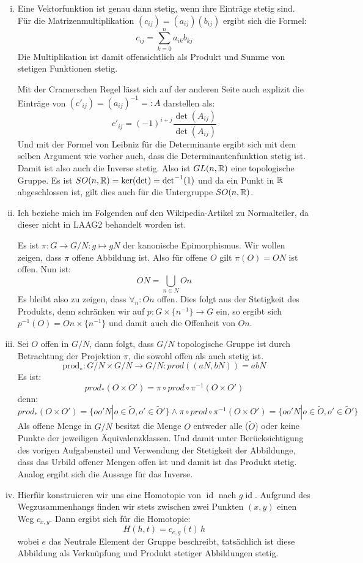 \documentclass{scrartcl}
\newcommand{\id}{\operatorname{id}}
\begin{document}
\newpage
\begin{aufgabe}
\begin{enumerate}[(i)]
\item Eine Vektorfunktion ist genau dann stetig, wenn ihre Einträge stetig sind. Für die Matrizenmultiplikation $ (c_{ij})=(a_{ij})(b_{ij}) $ ergibt sich die Formel:
\[
c_{ij}=\sum_{k=0}^n a_{ik} b_{kj}
\]
Die Multiplikation ist damit offensichtlich als Produkt und Summe von stetigen Funktionen stetig.
  
Mit der Cramerschen Regel lässt sich auf der anderen Seite auch explizit die Einträge von $(c'_{ij})=(a_{ij})^{-1}=:A$ darstellen als:
\[
c'_{ij}=(-1)^{i+j} \frac{\det(A_{ij})}{\det(A_{ij})}
\]
Und mit der Formel von Leibniz für die Determinante ergibt sich mit dem selben Argument wie vorher auch, dass die Determinantenfunktion stetig ist. Damit ist also auch die Inverse stetig. Also ist $ GL(n, \mathbb{R}) $ eine topologische Gruppe.  Es ist $ SO(n, \mathbb{R})=\ker(\det)=\det^{-1}(1) $ und da ein Punkt in $ \mathbb{R} $ abgeschlossen ist, gilt dies auch für die Untergruppe $ SO(n, \mathbb{R}) $. 

\item Ich beziehe mich im Folgenden auf den Wikipedia-Artikel zu Normalteiler, da dieser nicht in LAAG2 behandelt worden ist. 

Es ist $ \pi: G\to G/N: g\mapsto gN $ der kanonische Epimorphismus. Wir wollen zeigen, dass $ \pi $ offene Abbildung ist.  Also für offene $ O $ gilt $ \pi(O)=ON $ ist offen. Nun ist:
\[
ON=\bigcup_{n\in N} On
\]
Es bleibt also zu zeigen, dass $ \forall_n: On $ offen.  Dies folgt aus der Stetigkeit des Produkts, denn schränken wir auf $p: G\times\{n^{-1}\} \to G $ ein, so ergibt sich $ p^{-1}(O)=On\times \{n^{-1}\} $ und damit auch die Offenheit von $ On $.
\item Sei $ O $ offen in $ G/N $, dann folgt, dass $ G/N $ topologische Gruppe ist durch Betrachtung der Projektion $ \pi $, die sowohl offen als auch stetig ist.
\[
\text{prod}_*: G/N \times G/N \to G/N: prod((aN,bN))=abN
\]
Es ist:
\[
prod_*(O\times O')=\pi\circ prod \circ \pi^{-1} (O\times O')
\]
denn:
\[
prod_*(O \times O')=\{oo'N| o\in \tilde O, o' \in \tilde O'\} \land \pi\circ prod \circ \pi^{-1} (O\times O')=\{oo'N| o \in \tilde O, o' \in \tilde O'\}
\]
Als offene Menge in $ G/N $ besitzt die Menge $ O $ entweder alle ($ \tilde O $) oder keine Punkte der jeweiligen Äquivalenzklassen.
Und damit unter Berücksichtigung des vorigen Aufgabensteil und Verwendung der Stetigkeit der Abbildunge, dass das Urbild offener Mengen offen ist und damit ist das Produkt stetig. Analog ergibt sich die Aussage für das Inverse.
\item Hierfür konstruieren wir uns eine Homotopie von $ \id $ nach $ g\id $.  Aufgrund des Wegzusammenhangs finden wir stets zwischen zwei Punkten $(x,y)$ einen Weg $c_{x,y}$. Dann ergibt sich für die Homotopie:
\[
H(h,t)=c_{e, g}(t) \, h
\]
wobei $ e $ das Neutrale Element der Gruppe beschreibt, tatsächlich ist diese Abbildung als Verknüpfung und Produkt stetiger Abbildungen stetig.
\end{enumerate}
\end{aufgabe}
\end{document}
